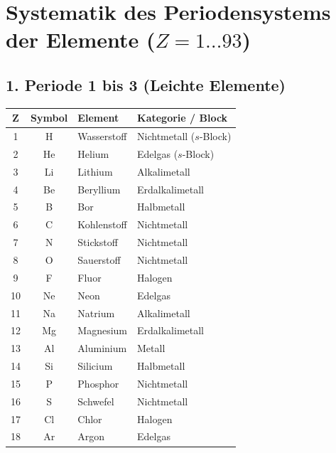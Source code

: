 \documentclass{article}
\begin{document}
	
	\section*{Systematik des Periodensystems der Elemente ($Z = 1 \dots 93$)}
	
	\subsection*{1. Periode 1 bis 3 (Leichte Elemente)}
	\begin{table}[htbp]
		\centering
		\small
		\begin{tabular}{ccll}
			\toprule
			$\mathbf{Z}$ & \textbf{Symbol} & \textbf{Element} & \textbf{Kategorie / Block} \\
			\midrule
			1  & H  & Wasserstoff & Nichtmetall ($s$-Block) \\
			2  & He & Helium      & Edelgas ($s$-Block) \\
			3  & Li & Lithium     & Alkalimetall \\
			4  & Be & Beryllium   & Erdalkalimetall \\
			5  & B  & Bor         & Halbmetall \\
			6  & C  & Kohlenstoff & Nichtmetall \\
			7  & N  & Stickstoff  & Nichtmetall \\
			8  & O  & Sauerstoff  & Nichtmetall \\
			9  & F  & Fluor       & Halogen \\
			10 & Ne & Neon        & Edelgas \\
			11 & Na & Natrium     & Alkalimetall \\
			12 & Mg & Magnesium   & Erdalkalimetall \\
			13 & Al & Aluminium   & Metall \\
			14 & Si & Silicium    & Halbmetall \\
			15 & P  & Phosphor    & Nichtmetall \\
			16 & S  & Schwefel    & Nichtmetall \\
			17 & Cl & Chlor       & Halogen \\
			18 & Ar & Argon       & Edelgas \\
			\bottomrule
		\end{tabular}
	\end{table}
	
\end{document}
